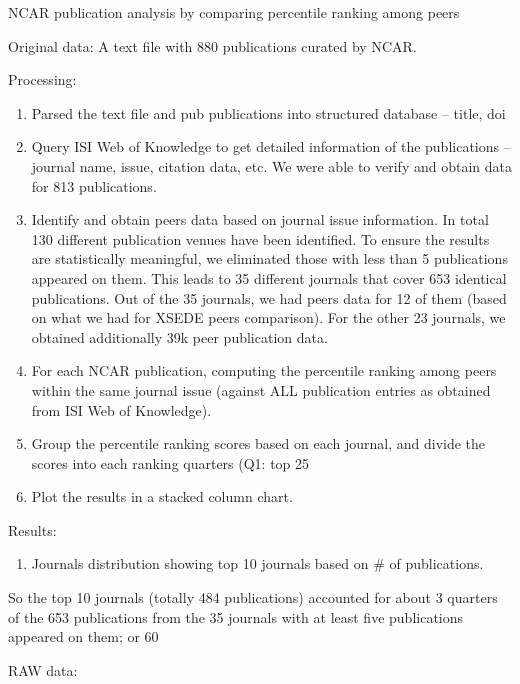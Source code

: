 \documentclass{sig-alternate}
\begin{document}
NCAR publication analysis by comparing percentile ranking among peers


Original data:
A text file with 880 publications curated by NCAR.

Processing:
\begin{enumerate}
\item	Parsed the text file and pub publications into structured database – title, doi
\item	Query ISI Web of Knowledge to get detailed information of the publications – journal name, issue, citation data, etc. We were able to verify and obtain data for 813 publications.
\item	Identify and obtain peers data based on journal issue information. In total 130 different publication venues have been identified. To ensure the results are statistically meaningful, we eliminated those with less than 5 publications appeared on them. This leads to 35 different journals that cover 653 identical publications. Out of the 35 journals, we had peers data for 12 of them (based on what we had for XSEDE peers comparison). For the other 23 journals, we obtained additionally 39k peer publication data.
\item	For each NCAR publication, computing the percentile ranking among peers within the same journal issue (against ALL publication entries as obtained from ISI Web of Knowledge).
\item	Group the percentile ranking scores based on each journal, and divide the scores into each ranking quarters (Q1: top 25%
\item	Plot the results in a stacked column chart.
\end{enumerate}

Results:
\begin{enumerate}
\item	Journals distribution showing top 10 journals based on \# of publications.
\end{enumerate}

So the top 10 journals (totally 484 publications) accounted for about 3 quarters of the 653 publications from the 35 journals with at least five publications appeared on them; or 60%

RAW data:
\end{document}
